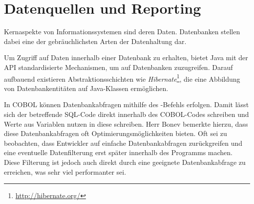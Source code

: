 \section{Datenquellen und Reporting}\label{reporting}

Kernaspekte von Informationssystemen sind deren Daten. Datenbanken stellen dabei eine der gebräuchlichsten Arten der Datenhaltung dar.

Um Zugriff auf Daten innerhalb einer Datenbank zu erhalten, bietet Java mit der  API standardisierte Mechanismen, um auf Datenbanken zuzugreifen. Darauf aufbauend existieren Abstraktionsschichten wie \textit{Hibernate}\footnote{\url{http://hibernate.org/}}, die eine Abbildung von Datenbankentitäten auf Java-Klassen ermöglichen.

In COBOL können Datenbankabfragen mithilfe des -Befehls erfolgen. Damit lässt sich der betreffende SQL-Code direkt innerhalb des COBOL-Codes schreiben und Werte aus Variablen nutzen \bzw in diese schreiben. Herr Bonev bemerkte hierzu, dass diese Datenbankabfragen oft Optimierungsmöglichkeiten bieten. Oft sei zu beobachten, dass Entwickler auf einfache Datenbankabfragen zurückgreifen und eine eventuelle Datenfilterung erst später innerhalb des Programms machen. Diese Filterung ist jedoch auch direkt durch eine geeignete Datenbankabfrage zu erreichen, was sehr viel performanter sei. 

